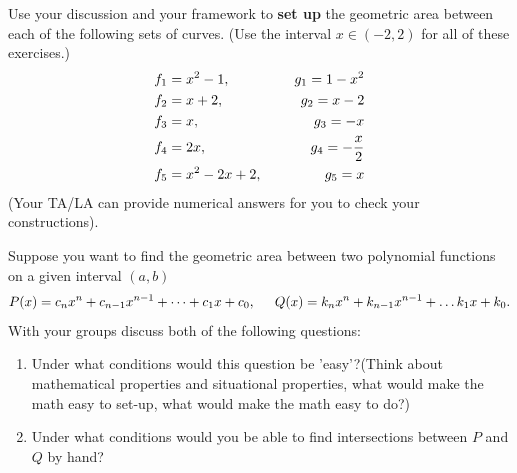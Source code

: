 \documentclass{ximera}
\begin{document}
\begin{exercise}
    Use your discussion and your framework to \textbf{set up} the geometric area between each of the following sets of curves. (Use the interval $x\in (-2,2)$ for all of these exercises.) %
    \begin{align}
        f_{1} &= x^2 -1, \hspace{.2in} &g_{1} = 1-x^2 \nonumber \\
        f_{2} &= x+2, \hspace{.2in} &g_{2} = x-2 \nonumber\\
        f_{3} &= x, \hspace{.2in} &g_{3}= -x \nonumber\\
        f_{4} &= 2x, \hspace{.2in} &g_{4}= -\frac{x}{2}\nonumber\\
        f_5 &= x^2-2x+2, \hspace{.2in} &g_5 = x \nonumber
    \end{align}
    (Your TA/LA can provide numerical answers for you to check your constructions).
\end{exercise}



\begin{exercise}
    Suppose you want to find the geometric area between two polynomial functions on a given interval $(a,b)$
        \begin{align}
        	P(x) = c_{n}x^n + c_{n-1}x^{n-1} + \dots +c_1x+ c_{0}, \hspace{.2in} Q(x) = k_{n}x^n + k_{n-1}x^{n-1} + \dots k_1x+ k_{0}.\nonumber
        \end{align}
With your groups discuss both of the following questions:
        \begin{enumerate}
            \item Under what conditions would this question be 'easy'?(Think about mathematical properties and situational properties, what would make the math easy to set-up, what would make the math easy to do?)
            \item Under what conditions would you be able to find intersections between $P$ and $Q$ by hand?
        \end{enumerate}
\end{exercise}
\end{document}
